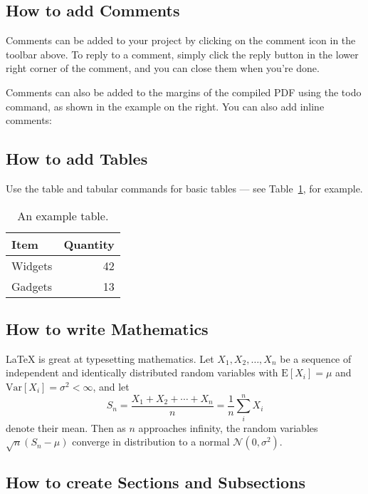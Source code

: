 \documentclass[a4paper]{article}
\begin{document}
\subsection{How to add Comments}

Comments can be added to your project by clicking on the comment icon in the toolbar above. %
%
%
To reply to a comment, simply click the reply button in the lower right corner of the comment, and you can close them when you're done.

Comments can also be added to the margins of the compiled PDF using the todo command, as shown in the example on the right. You can also add inline comments:


\subsection{How to add Tables}

Use the table and tabular commands for basic tables --- see Table~\ref{tab:widgets}, for example. 

\begin{table}
\centering
\begin{tabular}{l|r}
Item & Quantity \\\hline
Widgets & 42 \\
Gadgets & 13
\end{tabular}
\caption{\label{tab:widgets}An example table.}
\end{table}

\subsection{How to write Mathematics}

\LaTeX{} is great at typesetting mathematics. Let $X_1, X_2, \ldots, X_n$ be a sequence of independent and identically distributed random variables with $\text{E}[X_i] = \mu$ and $\text{Var}[X_i] = \sigma^2 < \infty$, and let
\[S_n = \frac{X_1 + X_2 + \cdots + X_n}{n}
      = \frac{1}{n}\sum_{i}^{n} X_i\]
denote their mean. Then as $n$ approaches infinity, the random variables $\sqrt{n}(S_n - \mu)$ converge in distribution to a normal $\mathcal{N}(0, \sigma^2)$.


\subsection{How to create Sections and Subsections}
\end{document}
